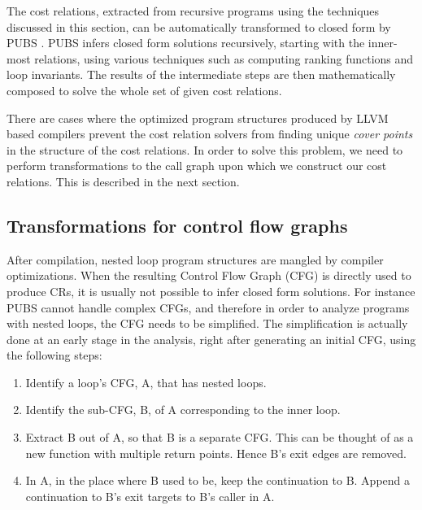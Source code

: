\documentclass[9pt,preprint]{sigplanconf}
\newcommand{\seclabel}[1]{\label{sec:#1}}
\begin{document}
The cost relations, extracted from recursive programs using the techniques
discussed in this section, can be automatically transformed to closed form by PUBS
\cite{AlbertAGP11a}.
PUBS infers closed form solutions recursively, starting with the inner-most
relations, using various techniques such as computing ranking functions and loop
invariants. The results of the intermediate steps are then mathematically composed to
solve the whole set of given cost relations.


There are cases where the optimized program structures produced by LLVM based
compilers prevent the cost relation solvers from finding unique \emph{cover
points} in the structure of the cost relations. In order to solve this problem,
we need to perform transformations to the call graph upon which we construct our
cost relations. This is described in the next section.

\subsection{Transformations for control flow graphs}\seclabel{transformations}
After compilation, nested loop program structures are mangled
by compiler optimizations. When the resulting Control Flow Graph (CFG) is directly
used to produce CRs, it is usually not possible to infer closed form
solutions. For instance PUBS \cite{AlbertAGP11a} cannot handle complex CFGs, and
therefore in order to analyze programs with nested loops, the
CFG needs to be simplified. The simplification is actually done at an early
stage in the analysis, right after generating an initial CFG,
using the following steps:

\begin{enumerate}
  \item Identify a loop's CFG, A, that has nested loops.
  \item Identify the sub-CFG, B, of A corresponding to the inner loop.
  \item Extract B out of A, so that B is a separate CFG. This can be thought
    of as a new function with multiple return points. Hence B's exit edges are
    removed.
  \item In A, in the place where B used to be, keep the continuation to B.
    Append a continuation to B's exit targets to B's caller in A.
\end{enumerate}
\end{document}
